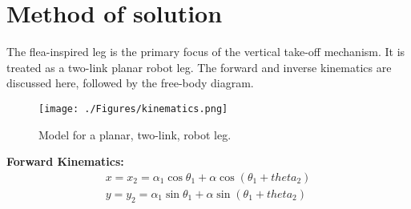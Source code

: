 \section{Method of solution}
\label{method}
\indent The flea-inspired leg is the primary focus of the vertical take-off mechanism. It is treated as a two-link planar robot leg. The forward and inverse kinematics are discussed here, followed by the free-body diagram.\\
\begin{figure}[H]
\begin{center}
\texttt{[image: ./Figures/kinematics.png]}
\caption{Model for a planar, two-link, robot leg.}
\label{fig:kinemaitcs}
\end{center}
\end{figure}
\textbf{Forward Kinematics:}
\begin{align}
	x = x_2 = \alpha_1\cos\theta_1 + \alpha\cos(\theta_1 + theta_2)\\
	y = y_2 = \alpha_1\sin\theta_1 + \alpha\sin(\theta_1 + theta_2)
\end{align}

